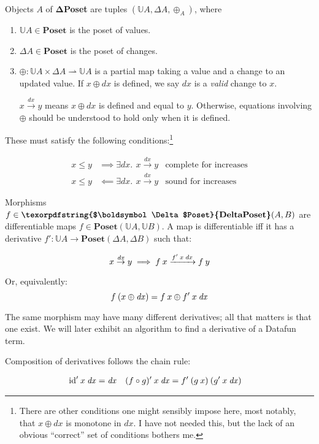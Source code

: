 \documentclass{rntz}\usepackage[a5]{rntzgeometry}\usepackage[fullwidth=130mm,width=330pt,]{narrow}
\newcommand\mathvar[1]{\ensuremath{#1}} %
\renewcommand\mathvar[1]{\ensuremath{\mathit{#1}}} %
\newcommand\cat\textbf
\newcommand\CP{\cat{\texorpdfstring{$\boldsymbol\Delta$Poset}{DeltaPoset}}}
\newcommand\Poset{\cat{Poset}}
\newcommand\D\Delta
\newcommand\x\times
\newcommand\pto\rightharpoonup
\newcommand\<{\mskip 4mu plus 4mu minus 1mu}
\newcommand\dx{\mathvar{dx}}
\newcommand\fname\text
\newcommand\id{\fname{id}}
\newcommand\valfn{\ensuremath{\mathbb{U}}}
\newcommand\vals{\valfn}
\newcommand\chgs[1]{\D{#1}}
\newcommand\deriv[1]{\ensuremath{#1'}}
\newcommand\upd{\mathbin{\oplus}}
\newcommand\updfn{\ensuremath{{\upd}}}
\newcommand\quantifierspace{~\,}
\newcommand\ex[1]{\exists #1.\quantifierspace}
\newcommand\validarrow\to
\newcommand\valid[1]{\mathrel{\overset{#1}{\validarrow}}}
\newcommand\longvalid[1]{\mathrel{\xrightarrow{#1}}}
\newcommand\vld[3]{{#2 \valid{#1} #3}}
\newcommand\longvld[3]{{#2 \longvalid{#1} #3}}
\begin{document}
Objects $A$ of \CP{} are tuples $(\vals A, \chgs A, \updfn_A)$, where
%
\begin{enumerate}
\item $\vals A \in \Poset$ is the poset of values.

\item $\chgs A \in \Poset$ is the poset of changes.

\item $\updfn : \vals A \x \chgs A \pto \vals A$ is a partial map taking a value
  and a change to an updated value. If $x \upd \dx$ is defined, we say $\dx$ is a
  \emph{valid} change to $x$.

  $\vld{\dx} x y$ means $x \upd \dx$ is defined and equal to $y$. Otherwise,
  equations inv\-olv\-ing \updfn{} should be understood to hold only when it is
  defined.
\end{enumerate}

\noindent
These must satisfy the following conditions:\footnote{There are other conditions
  one might sensibly impose here, most notably, that $x \upd \dx$ is monotone in
  $\dx$. I have not needed this, but the lack of an obvious ``correct'' set of
  conditions bothers me.}

\begin{align*}
  x \le y &\implies \ex{\dx} \vld{\dx} x y
  & \text{complete for increases}\\
  x \le y &\impliedby \ex{\dx} \vld{\dx} x y
  & \text{sound for increases}
\end{align*}

\noindent
Morphisms $f \in \CP(A,B)$ are differentiable maps $f \in \Poset(\vals A, \vals
B)$. A map is differentiable iff it has a derivative $\deriv f : \vals A \to
\Poset(\chgs A, \chgs B)$ such that:

\[ \vld{\dx} x y \implies \longvld{\deriv f\<x\<\dx}{f\<x}{f\<y}\]

\noindent Or, equivalently:
\[ f\<(x \upd \dx) = f\<x \upd \deriv f\<x\<\dx \]

\noindent
The same morphism may have many different derivatives; all that matters is that
one exist. We will later exhibit an algorithm to find a derivative of a Datafun
term.

Composition of derivatives follows the chain rule:

\begin{align*}
  \deriv\id \<x\<\dx &= \dx
  & \deriv{(f \circ g)} \<x\<\dx &= \deriv f \<(g\<x) \<(\deriv g\<x\<\dx)
\end{align*}
\end{document}
